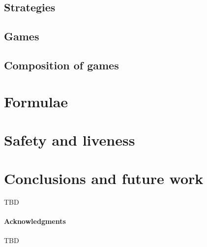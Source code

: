 \documentclass[]{acm_proc_article-sp}
\numberwithin{equation}{subsection}
\begin{document}
\subsection{Strategies}

\subsection{Games}

\subsection{Composition of games}

\section{Formulae}

\section{Safety and liveness}

\section{Conclusions and future work}

TBD

\paragraph{Acknowledgments}

TBD







\end{document}
